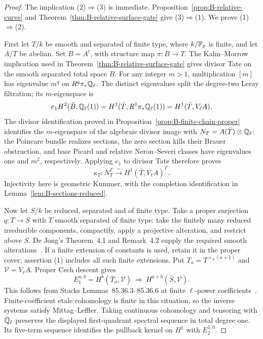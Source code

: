 \begin{proof}
The implication (2)\(\Rightarrow\)(3) is immediate.
Proposition~\ref{prop:B-relative-curve} and
Theorem~\ref{thm:B-relative-surface-gate} give
(3)\(\Rightarrow\)(1).  We prove (1)\(\Rightarrow\)(2).

First let \(T/k\) be smooth and separated of finite type,
where \(k/\mathbb F_p\) is finite, and let \(A/T\) be abelian.
Set \(B=A^t\), with structure map \(\pi:B\to T\).
The Kahn--Morrow implication used in
Theorem~\ref{thm:B-relative-surface-gate} gives divisor Tate
on the smooth separated total space \(B\).
For any integer \(m>1\), multiplication \([m]\) has
eigenvalue \(m^q\) on \(R^q\pi_*\mathbb Q_\ell\).
The distinct eigenvalues split the degree-two Leray filtration;
its \(m\)-eigenspace is
\[
 e_1 H^2(\bar B,\mathbb Q_\ell(1))
 =H^1(\bar T,R^1\pi_*\mathbb Q_\ell(1))
 =H^1(\bar T,V_\ell A).
\]
The divisor identification proved in
Proposition~\ref{prop:B-finite-chain-proper} identifies the
\(m\)-eigenspace of the algebraic divisor image with
\(N_T=A(\bar T)\otimes\mathbb Q_\ell\): the Poincare bundle
realizes sections, the zero section kills their Brauer obstruction,
and base Picard and relative Neron--Severi classes have eigenvalues
one and \(m^2\), respectively.  Applying \(e_1\) to
divisor Tate therefore proves
\[
 \kappa_T:N_T^\Gamma
 \xrightarrow{\sim}H^1(\bar T,V_\ell A)^\Gamma.
\]
Injectivity here is geometric Kummer, with the completion
identification in Lemma~\ref{lem:B-sections-reduced}.

Now let \(S/k\) be reduced, separated and of finite type.
Take a proper surjection \(q:T\to S\) with \(T\)
smooth separated of finite type: take the finitely many reduced
irreducible components, compactify, apply a projective alteration,
and restrict above \(S\).  De Jong's Theorem~4.1 and
Remark~4.2 supply the required smooth alterations~\cite{c_dejong1996}.
If a finite extension of constants is used, retain it in the
proper cover; assertion (1) includes all such finite extensions.
Put \(T_a=T^{\times_S(a+1)}\) and
\(\mathcal V=V_\ell A\).  Proper Cech descent gives
\[
 E_1^{a,b}=H^b(\bar T_a,\mathcal V)
 \ \Longrightarrow\ H^{a+b}(\bar S,\mathcal V).
\]
This follows from Stacks Lemmas~85.36.3--85.36.6 at finite
\(\ell\)-power coefficients~\cite{BStacksProperDescent}.
Finite-coefficient etale cohomology is finite in this situation,
so the inverse systems satisfy Mittag--Leffler.  Taking continuous
cohomology and tensoring with \(\mathbb Q_\ell\) preserves the
displayed first-quadrant spectral sequence in total degree one.
Its five-term sequence identifies the pullback kernel on
\(H^1\) with \(E_2^{1,0}\).


\end{proof}

